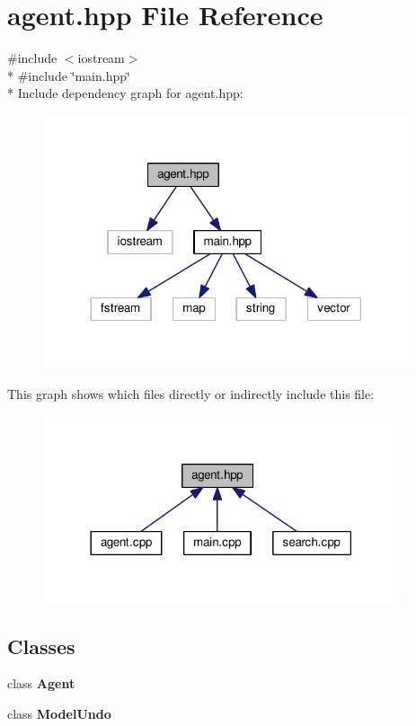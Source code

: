 \section{agent.\+hpp File Reference}
\label{agent_8hpp}
{\ttfamily \#include $<$iostream$>$}\\*
{\ttfamily \#include \char`\"{}main.\+hpp\char`\"{}}\\*
Include dependency graph for agent.\+hpp\+:
\nopagebreak
\begin{figure}[H]
\begin{center}
\leavevmode
\includegraphics[width=305pt]{agent_8hpp__incl}
\end{center}
\end{figure}
This graph shows which files directly or indirectly include this file\+:
\nopagebreak
\begin{figure}[H]
\begin{center}
\leavevmode
\includegraphics[width=297pt]{agent_8hpp__dep__incl}
\end{center}
\end{figure}
\subsection*{Classes}
\begin{DoxyCompactItemize}
\item 
class {\bf Agent}
\item 
class {\bf Model\+Undo}
\end{DoxyCompactItemize}
